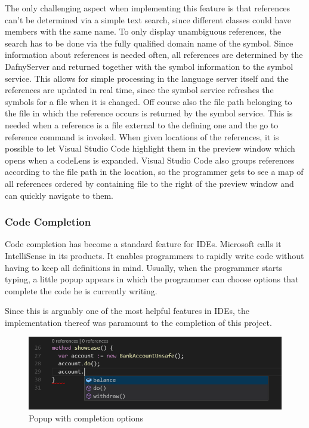 The only challenging aspect when implementing this feature is that references can't be determined via a simple text search, since different classes could have members with the same name. To only display unambiguous references, the search has to be done via the fully qualified domain name of the symbol. Since information about references is needed often, all references are determined by the DafnyServer and returned together with the symbol information to the symbol service. This allows for simple processing in the language server itself and the references are updated in real time, since the symbol service refreshes the symbols for a file when it is changed. Off course also the file path belonging to the file in which the reference occurs is returned by the symbol service. This is needed when a reference is a file external to the defining one and the go to reference command is invoked.\newline
When given locations of the references, it is possible to let Visual Studio Code highlight them in the preview window which opens when a codeLens is expanded. Visual Studio Code also groups references according to the file path in the location, so the programmer gets to see a map of all references ordered by containing file to the right of the preview window and can quickly navigate to them.

 \subsubsection{Code Completion} \label{codecompletion}
 Code completion has become a standard feature for IDEs. Microsoft calls it IntelliSense in its products. It enables programmers to rapidly write code without having to keep all definitions in mind. Usually, when the programmer starts typing, a little popup appears in which the programmer can choose options that complete the code he is currently writing. \newline
 
 Since this is arguably one of the most helpful features in IDEs, the implementation thereof was paramount to the completion of this project. \newline
 
 \begin{figure}[H]
 	\centering
 	\includegraphics[width=1\textwidth]{img/codeCompletionOverview}
 	\caption{Popup with completion options}
 	\label{fig:codecompletionoverview}
 \end{figure}
 

